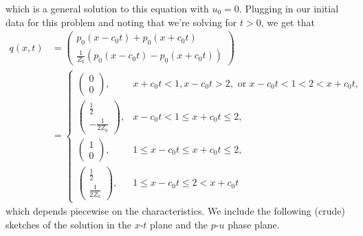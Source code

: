 \documentclass{article}
\begin{document}
which is a general solution to this equation with $u_0=0$. Plugging in our initial data for this problem and noting that we're solving for $t>0$, we get that
\begin{align*}
q(x,t)&=\begin{pmatrix}
	p_0(x-c_0t)+p_0(x+c_0t)\\
	\frac{1}{Z_0}(p_0(x-c_0t)-p_0(x+c_0t))
\end{pmatrix}\\&=
\begin{cases}
\begin{pmatrix}
	0\\0
\end{pmatrix}, &x+c_0t<1,x-c_0t>2,\text{ or }x-c_0t<1<2<x+c_0t,\\
\begin{pmatrix}
	\frac{1}{2}\\-\frac{1}{2Z_0}
\end{pmatrix}, &x-c_0t<1\leq x+c_0t\leq2,\\
\begin{pmatrix}
	1\\0
\end{pmatrix}, &1\leq x-c_0t\leq x+c_0t\leq2,\\
\begin{pmatrix}
	\frac{1}{2}\\\frac{1}{2Z_0}
\end{pmatrix}, &1\leq x-c_0t\leq2< x+c_0t
\end{cases}
\end{align*}
which depends piecewise on the characteristics. We include the following (crude) sketches of the solution in the $x$-$t$ plane and the $p$-$u$ phase plane.\\
\end{document}
